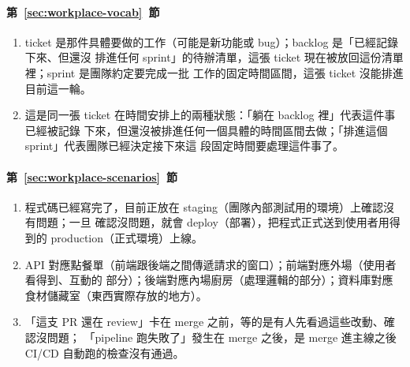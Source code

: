 \paragraph{第~\ref{sec:workplace-vocab}~節}
\begin{enumerate}
\item ticket 是那件具體要做的工作（可能是新功能或 bug）；backlog 是「已經記錄下來、但還沒
排進任何 sprint」的待辦清單，這張 ticket 現在被放回這份清單裡；sprint 是團隊約定要完成一批
工作的固定時間區間，這張 ticket 沒能排進目前這一輪。
\item 這是同一張 ticket 在時間安排上的兩種狀態：「躺在 backlog 裡」代表這件事已經被記錄
下來，但還沒被排進任何一個具體的時間區間去做；「排進這個 sprint」代表團隊已經決定接下來這
段固定時間要處理這件事了。
\end{enumerate}

\paragraph{第~\ref{sec:workplace-scenarios}~節}
\begin{enumerate}
\item 程式碼已經寫完了，目前正放在 staging（團隊內部測試用的環境）上確認沒有問題；一旦
確認沒問題，就會 deploy（部署），把程式正式送到使用者用得到的 production（正式環境）上線。
\item API 對應點餐單（前端跟後端之間傳遞請求的窗口）；前端對應外場（使用者看得到、互動的
部分）；後端對應內場廚房（處理邏輯的部分）；資料庫對應食材儲藏室（東西實際存放的地方）。
\item 「這支 PR 還在 review」卡在 merge 之前，等的是有人先看過這些改動、確認沒問題；
「pipeline 跑失敗了」發生在 merge 之後，是 merge 進主線之後 CI/CD 自動跑的檢查沒有通過。
\end{enumerate}
